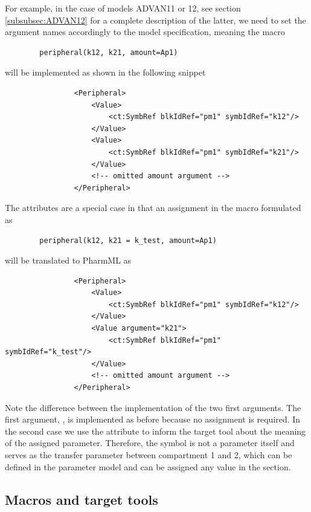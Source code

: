 For example, in the case of models ADVAN11 or 12, see section \ref{subsubsec:ADVAN12} 
for a complete description of the latter, 
we need to set the  argument names accordingly to the model specification, 
meaning the macro 
\lstset{language=NONMEMdataSet}
\begin{lstlisting}
		peripheral(k12, k21, amount=Ap1)
\end{lstlisting}
will be implemented as shown in the following snippet
\lstset{language=XML}
\begin{lstlisting}
                <Peripheral>
                    <Value>
                        <ct:SymbRef blkIdRef="pm1" symbIdRef="k12"/>
                    </Value>
                    <Value>
                        <ct:SymbRef blkIdRef="pm1" symbIdRef="k21"/>
                    </Value>
                    <!-- omitted amount argument -->
                </Peripheral>
\end{lstlisting}

The  attributes are a special case in that an assignment in the macro 
formulated as
\lstset{language=NONMEMdataSet}
\begin{lstlisting}
		peripheral(k12, k21 = k_test, amount=Ap1)
\end{lstlisting}
will be translated to PharmML as
\lstset{language=XML}
\begin{lstlisting}
                <Peripheral>
                    <Value>
                        <ct:SymbRef blkIdRef="pm1" symbIdRef="k12"/>
                    </Value>
                    <Value argument="k21">
                        <ct:SymbRef blkIdRef="pm1" symbIdRef="k_test"/>
                    </Value>
                    <!-- omitted amount argument -->
                </Peripheral>
\end{lstlisting}
Note the difference between the implementation of the two first arguments. 
The first argument, , is implemented as before because no assignment
is required. In the second case we use the  attribute to inform 
the target tool about the meaning of the assigned parameter. Therefore, the 
symbol  is not a parameter itself and  serves as the 
transfer parameter  between compartment 1 and 2, which can be defined 
in the parameter model  and can be assigned any value in the 
 section.


\subsection{Macros and target tools}
\label{subsec:LinkingMacrosDatasets}

